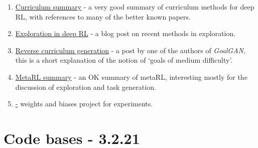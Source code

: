 \documentclass[letterpaper]{article}
\theoremstyle{definition}
\begin{document}
\begin{enumerate}
	\item 
	\href{https://lilianweng.github.io/lil-log/2020/01/29/curriculum-for-reinforcement-learning.html}{Curriculum summary} - a very good summary of curriculum methods for deep RL, with references to many of the better known papers.
	
	\item \href{https://lilianweng.github.io/lil-log/2020/06/07/exploration-strategies-in-deep-reinforcement-learning.html}{Exploration in deep RL} - a blog post on recent methods in exploration.
	
	\item 
	\href{https://bair.berkeley.edu/blog/2017/12/20/reverse-curriculum/}{Reverse curriculum generation} - a post by one of the authors of \textit{GoalGAN}, this is a short explanation of the notion of `goals of medium difficulty'.
	
	\item 
	\href{https://lilianweng.github.io/lil-log/2019/06/23/meta-reinforcement-learning.html}{MetaRL summary} - an OK summary of metaRL, interesting mostly for the discussion of exploration and task generation.
	
	\item 
	\href{https://wandb.ai/liorf/curriculum_rl} - weights and biases project for experiments.

\end{enumerate}

\section{Code bases - 3.2.21} \label{sec:code}
\end{document}
